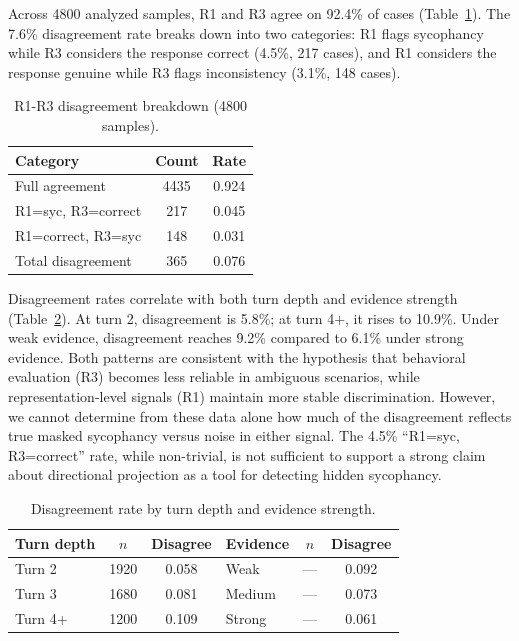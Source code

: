 \documentclass[11pt,a4paper]{article}
\begin{document}
Across 4800 analyzed samples, R1 and R3 agree on 92.4\% of cases (Table~\ref{tab:disagreement}). The 7.6\% disagreement rate breaks down into two categories: R1 flags sycophancy while R3 considers the response correct (4.5\%, 217 cases), and R1 considers the response genuine while R3 flags inconsistency (3.1\%, 148 cases).

\begin{table}[t]
\centering
\caption{R1-R3 disagreement breakdown (4800 samples).}
\label{tab:disagreement}
\small
\begin{tabular}{lcc}
\toprule
Category & Count & Rate \\
\midrule
Full agreement & 4435 & 0.924 \\
R1=syc, R3=correct & 217 & 0.045 \\
R1=correct, R3=syc & 148 & 0.031 \\
Total disagreement & 365 & 0.076 \\
\bottomrule
\end{tabular}
\end{table}

Disagreement rates correlate with both turn depth and evidence strength (Table~\ref{tab:disagree_depth}). At turn 2, disagreement is 5.8\%; at turn 4+, it rises to 10.9\%. Under weak evidence, disagreement reaches 9.2\% compared to 6.1\% under strong evidence. Both patterns are consistent with the hypothesis that behavioral evaluation (R3) becomes less reliable in ambiguous scenarios, while representation-level signals (R1) maintain more stable discrimination. However, we cannot determine from these data alone how much of the disagreement reflects true masked sycophancy versus noise in either signal. The 4.5\% ``R1=syc, R3=correct'' rate, while non-trivial, is not sufficient to support a strong claim about directional projection as a tool for detecting hidden sycophancy.

\begin{table}[t]
\centering
\caption{Disagreement rate by turn depth and evidence strength.}
\label{tab:disagree_depth}
\small
\begin{tabular}{lcclcc}
\toprule
Turn depth & $n$ & Disagree & \quad Evidence & $n$ & Disagree \\
\midrule
Turn 2  & 1920 & 0.058 & \quad Weak   & --- & 0.092 \\
Turn 3  & 1680 & 0.081 & \quad Medium & --- & 0.073 \\
Turn 4+ & 1200 & 0.109 & \quad Strong & --- & 0.061 \\
\bottomrule
\end{tabular}
\end{table}
\end{document}
